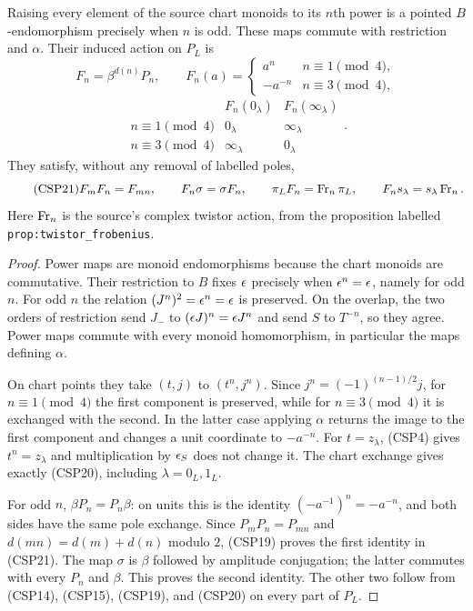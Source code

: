 \begin{theorem}\label{thm:frob}
Raising every element of the source chart monoids to its $n$th power
is a pointed $B$-endomorphism precisely when $n$ is odd.  These maps
commute with restriction and $\alpha$.  Their induced action on
$P_L$ is
\begin{equation}\tag{CSP19}
 F_n=\beta^{d(n)}P_n,\qquad
 F_n(a)=\begin{cases}a^n&n\equiv1\pmod4,\\-a^{-n}&n\equiv3\pmod4,
 \end{cases}
\end{equation}
\begin{equation}\tag{CSP20}
 \begin{array}{c|cc}
 &F_n(0_\lambda)&F_n(\infty_\lambda)\\\hline
 n\equiv1\pmod4&0_\lambda&\infty_\lambda\\
 n\equiv3\pmod4&\infty_\lambda&0_\lambda
 \end{array}.
\end{equation}
They satisfy, without any removal of labelled poles,
\begin{equation}\tag{CSP21}
 F_mF_n=F_{mn},\qquad F_n\sigma=\sigma F_n,\qquad
 \pi_LF_n=\operatorname{Fr}_n\pi_L,\qquad F_ns_\lambda=s_\lambda\operatorname{Fr}_n.
\end{equation}
Here $\operatorname{Fr}_n$ is the source's complex twistor action, from the
proposition labelled\\\texttt{prop:twistor\_frobenius}.
\end{theorem}
\begin{proof}
Power maps are monoid endomorphisms because the chart monoids are
commutative.  Their restriction to $B$ fixes $\epsilon$ precisely when
$\epsilon^n=\epsilon$, namely for odd $n$.  For odd $n$ the relation
$(J^n)^2=\epsilon^n=\epsilon$ is preserved.  On the overlap, the two orders
of restriction send $J_-$ to $(\epsilon J)^n=\epsilon J^n$ and send
$S$ to $T^{-n}$, so they agree.  Power maps commute with every
monoid homomorphism, in particular the maps defining $\alpha$.

On chart points they take $(t,j)$ to $(t^n,j^n)$.  Since
$j^n=(-1)^{(n-1)/2}j$, for $n\equiv1\pmod4$ the first component
is preserved, while for $n\equiv3\pmod4$ it is exchanged with the
second.  In the latter case applying $\alpha$ returns the image to
the first component and changes a unit coordinate to $-a^{-n}$.
For $t=z_\lambda$, (CSP4) gives $t^n=z_\lambda$ and multiplication
by $\epsilon_S$ does not change it.  The chart exchange gives exactly
(CSP20), including $\lambda=0_L,1_L$.

For odd $n$, $\beta P_n=P_n\beta$: on units this is the identity
$(-a^{-1})^n=-a^{-n}$, and both sides have the same pole exchange.
Since $P_mP_n=P_{mn}$ and $d(mn)=d(m)+d(n)$ modulo $2$, (CSP19)
proves the first identity in (CSP21).  The map $\sigma$ is $\beta$
followed by amplitude conjugation; the latter commutes with every
$P_n$ and $\beta$.  This proves the second identity.  The other two
follow from (CSP14), (CSP15), (CSP19), and (CSP20) on every part of
$P_L$.
\end{proof}

